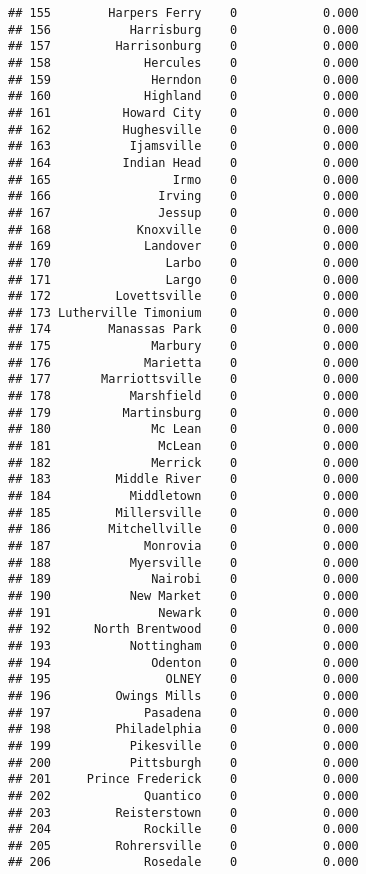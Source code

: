 \documentclass[]{article}
\begin{document}
\begin{verbatim}
## 155        Harpers Ferry    0            0.000
## 156           Harrisburg    0            0.000
## 157         Harrisonburg    0            0.000
## 158             Hercules    0            0.000
## 159              Herndon    0            0.000
## 160             Highland    0            0.000
## 161          Howard City    0            0.000
## 162          Hughesville    0            0.000
## 163           Ijamsville    0            0.000
## 164          Indian Head    0            0.000
## 165                 Irmo    0            0.000
## 166               Irving    0            0.000
## 167               Jessup    0            0.000
## 168            Knoxville    0            0.000
## 169             Landover    0            0.000
## 170                Larbo    0            0.000
## 171                Largo    0            0.000
## 172         Lovettsville    0            0.000
## 173 Lutherville Timonium    0            0.000
## 174        Manassas Park    0            0.000
## 175              Marbury    0            0.000
## 176             Marietta    0            0.000
## 177       Marriottsville    0            0.000
## 178           Marshfield    0            0.000
## 179          Martinsburg    0            0.000
## 180              Mc Lean    0            0.000
## 181               McLean    0            0.000
## 182              Merrick    0            0.000
## 183         Middle River    0            0.000
## 184           Middletown    0            0.000
## 185         Millersville    0            0.000
## 186        Mitchellville    0            0.000
## 187             Monrovia    0            0.000
## 188           Myersville    0            0.000
## 189              Nairobi    0            0.000
## 190           New Market    0            0.000
## 191               Newark    0            0.000
## 192      North Brentwood    0            0.000
## 193           Nottingham    0            0.000
## 194              Odenton    0            0.000
## 195                OLNEY    0            0.000
## 196         Owings Mills    0            0.000
## 197             Pasadena    0            0.000
## 198         Philadelphia    0            0.000
## 199           Pikesville    0            0.000
## 200           Pittsburgh    0            0.000
## 201     Prince Frederick    0            0.000
## 202             Quantico    0            0.000
## 203         Reisterstown    0            0.000
## 204             Rockille    0            0.000
## 205         Rohrersville    0            0.000
## 206             Rosedale    0            0.000

\end{verbatim}
\end{document}
